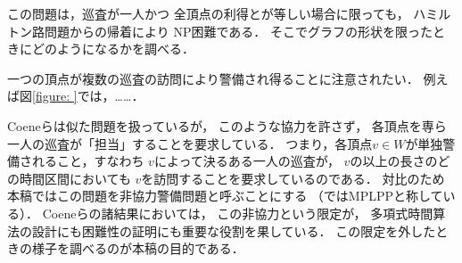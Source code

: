 

この問題は，巡査が一人かつ
全頂点の利得と{\timelimit}が等しい場合に限っても，
ハミルトン路問題からの帰着により
NP困難である\cite[Theorem~8]{coene2011charlemagne}．
そこでグラフの形状を限ったときにどのようになるかを調べる．

一つの頂点が複数の巡査の訪問により警備され得ることに注意されたい．
例えば図\ref{figure: }では，……．

Coeneら\cite{coene2011charlemagne}は似た問題を扱っているが，
このような協力を許さず，
各頂点を専ら一人の巡査が「担当」することを要求している．
つまり，各頂点$v \in W$が単独警備されること，すなわち
$v$によって決るある一人の巡査が，
$v$の{\timelimit}以上の長さのどの時間区間においても
$v$を訪問することを要求しているのである．
対比のため本稿ではこの問題を非協力警備問題と呼ぶことにする
（\cite{coene2011charlemagne}ではMPLPPと称している）．
Coeneら\cite{coene2011charlemagne}の諸結果においては，
この非協力という限定が，
多項式時間算法の設計にも困難性の証明にも重要な役割を果している．
この限定を外したときの様子を調べるのが本稿の目的である．

